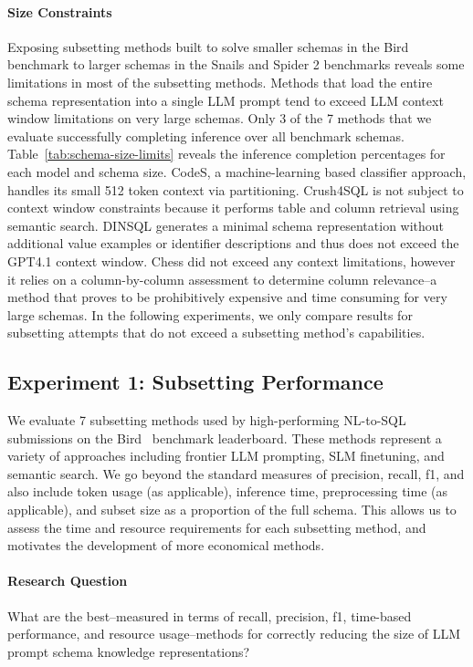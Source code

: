 \paragraph{\textbf{Size Constraints}}

Exposing subsetting methods built to solve smaller schemas in the Bird benchmark to larger schemas in the Snails and Spider 2 benchmarks reveals some limitations in most of the subsetting methods.
Methods that load the entire schema representation into a single LLM prompt tend to exceed LLM context window limitations on very large schemas. 
Only 3 of the 7 methods that we evaluate successfully completing inference over all benchmark schemas. 
Table~\ref{tab:schema-size-limits} reveals the inference completion percentages for each model and schema size.
CodeS, a machine-learning based classifier approach, handles its small 512 token context via partitioning. 
Crush4SQL is not subject to context window constraints because it performs table and column retrieval using semantic search.
DINSQL generates a minimal schema representation without additional value examples or identifier descriptions and thus does not exceed the GPT4.1 context window.
Chess did not exceed any context limitations, however it relies on a column-by-column assessment to determine column relevance--a method that proves to be prohibitively expensive and time consuming for very large schemas.
In the following experiments, we only compare results for subsetting attempts that do not exceed a subsetting method's capabilities.

\subsection{Experiment 1: Subsetting Performance}
\label{subsection:experiment1}

We evaluate 7 subsetting methods used by high-performing NL-to-SQL submissions on the Bird~\cite{benchmark-bird} benchmark leaderboard.
These methods represent a variety of approaches including frontier LLM prompting, SLM finetuning, and semantic search.
We go beyond the standard measures of precision, recall, f1, and also include token usage (as applicable), inference time, preprocessing time (as applicable), and subset size as a proportion of the full schema.
This allows us to assess the time and resource requirements for each subsetting method, and motivates the development of more economical methods.

\paragraph{\textbf{Research Question}} What are the best--measured in terms of recall, precision, f1, time-based performance, and resource usage--methods for correctly reducing the size of LLM prompt schema knowledge representations? 

